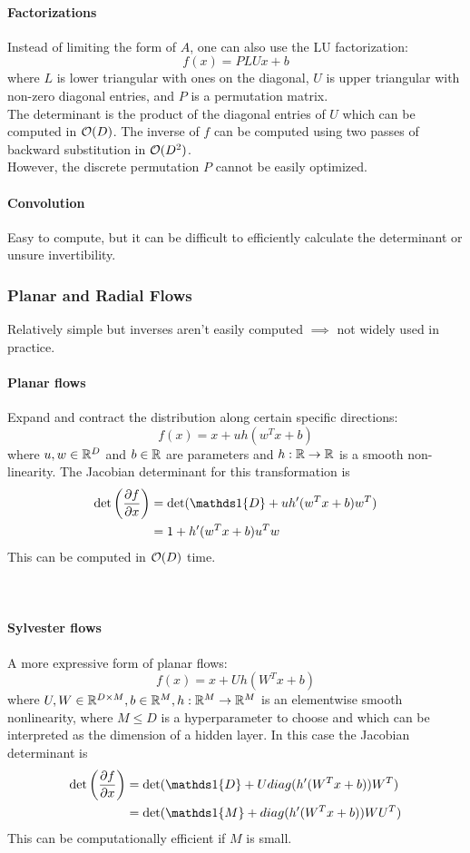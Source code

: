 \documentclass[11pt]{article}
\begin{document}
\paragraph{Factorizations}
Instead of limiting the form of $A$, one can also use the LU factorization:
$$f(x) = PLUx + b$$
where $L$ is lower triangular with ones on the diagonal, $U$ is upper triangular with non-zero diagonal entries, and $P$ is a permutation matrix.\\
The determinant is the product of the diagonal entries of $U$ which can be computed in $\mathcal{O}(D)$. The inverse of $f$ can be computed using two passes of backward substitution in $\mathcal{O}(D^2)$. \\
However, the discrete permutation $P$ cannot be easily optimized.
\paragraph{Convolution}
Easy to compute, but it can be difficult to efficiently calculate the determinant or unsure invertibility.
\subsubsection{Planar and Radial Flows}
Relatively simple but inverses aren't easily computed $\implies$ not widely used in practice.\\
\paragraph{Planar flows}
Expand and contract the distribution along certain specific directions:
$$f(x) = x + uh(w^Tx + b)$$
where $u, w \in \mathbb{R}^D$ and $b \in \mathbb{R}$ are parameters and $h: \mathbb{R} \rightarrow \mathbb{R}$ is a smooth non-linearity. The Jacobian determinant for this transformation is
\begin{align*}
	\det \left( \frac{\partial f}{\partial x} \right)&= \det (\id{D} + uh'(w^Tx + b)w^T) \\
	&= 1 + h'(w^Tx + b)u^Tw
\end{align*}
This can be computed in $\mathcal{O}(D)$ time. \\
\\\\
\paragraph{Sylvester flows}
A more expressive form of planar flows:
$$f(x) = x + Uh(W^Tx + b)$$
where $U, W \in \mathbb{R}^{D \times M}, b \in \mathbb{R}^M, h:\mathbb{R}^M \rightarrow \mathbb{R}^M$ is an elementwise smooth nonlinearity, where $M \leq D$ is a hyperparameter to choose and which can be interpreted as the dimension of a hidden layer. In this case the Jacobian determinant is
\begin{align*}
	\det \left( \frac{\partial f}{\partial x} \right) &= \det(\id{D} + U diag(h'(W^Tx + b)) W^T) \\
	&= \det (\id{M} + diag(h'(W^Tx + b)) WU^T)
\end{align*}
This can be computationally efficient if $M$ is small.\\\\
\end{document}
